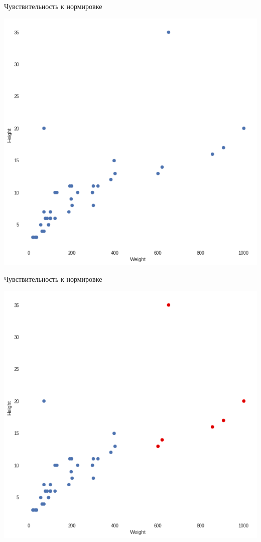 \documentclass[10pt]{beamer}
\begin{document}
\begin{frame}{Чувствительность к нормировке}
	\begin{center}
	  \includegraphics[height=0.8 \textheight, keepaspectratio = true]{images/weight_height1}  
	\end{center}
\end{frame}

\begin{frame}{Чувствительность к нормировке}
	\begin{center}
	  \includegraphics[height=0.8 \textheight, keepaspectratio = true]{images/weight_height2}  
	\end{center}
\end{frame}
\end{document}
